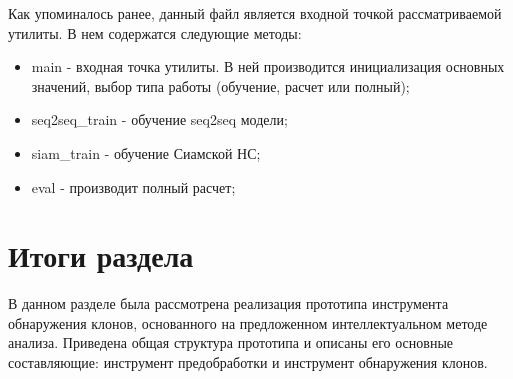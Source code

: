 Как упоминалось ранее, данный файл является входной точкой рассматриваемой утилиты. В нем содержатся следующие методы:

\begin{itemize}
\setlength\itemsep{0mm}
\item main - входная точка утилиты. В ней производится инициализация основных значений, выбор типа работы (обучение, расчет или полный);
\item seq2seq\_train - обучение seq2seq модели;
\item siam\_train - обучение Сиамской НС;
\item eval - производит полный расчет;
\end{itemize}

\section{Итоги раздела}

В данном разделе была рассмотрена реализация прототипа инструмента обнаружения клонов, основанного на предложенном интеллектуальном методе анализа. Приведена общая структура прототипа и описаны его основные составляющие: инструмент предобработки и инструмент обнаружения клонов.
